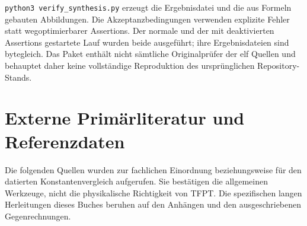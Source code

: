 \texttt{python3 verify\_synthesis.py} erzeugt die Ergebnisdatei und die aus Formeln gebauten Abbildungen. Die Akzeptanzbedingungen verwenden explizite Fehler statt wegoptimierbarer Assertions. Der normale und der mit deaktivierten Assertions gestartete Lauf wurden beide ausgeführt; ihre Ergebnisdateien sind bytegleich. Das Paket enthält nicht sämtliche Originalprüfer der elf Quellen und behauptet daher keine vollständige Reproduktion des ursprünglichen Repository-Stands.

\section{Externe Primärliteratur und Referenzdaten}
Die folgenden Quellen wurden zur fachlichen Einordnung beziehungsweise für den datierten Konstantenvergleich aufgerufen. Sie bestätigen die allgemeinen Werkzeuge, nicht die physikalische Richtigkeit von TFPT. Die spezifischen langen Herleitungen dieses Buches beruhen auf den Anhängen und den ausgeschriebenen Gegenrechnungen.
